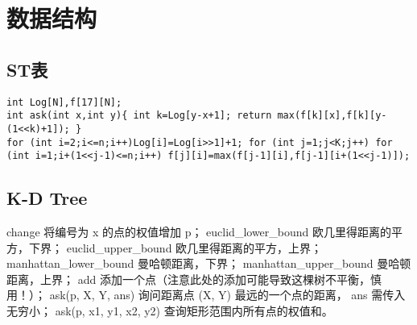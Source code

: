 \documentclass[landscape,a4paper]{article}
\begin{document}
\section{数据结构}
\subsection{ST表}
\begin{lstlisting}
int Log[N],f[17][N];
int ask(int x,int y){ int k=Log[y-x+1]; return max(f[k][x],f[k][y-(1<<k)+1]); }
for (int i=2;i<=n;i++)Log[i]=Log[i>>1]+1; for (int j=1;j<K;j++) for (int i=1;i+(1<<j-1)<=n;i++) f[j][i]=max(f[j-1][i],f[j-1][i+(1<<j-1)]);
\end{lstlisting}

\subsection{K-D Tree}

 change 将编号为 x 的点的权值增加 p；
 euclid\_lower\_bound 欧几里得距离的平方，下界；
 euclid\_upper\_bound 欧几里得距离的平方，上界；
 manhattan\_lower\_bound 曼哈顿距离，下界；
 manhattan\_upper\_bound 曼哈顿距离，上界；
 add 添加一个点（注意此处的添加可能导致这棵树不平衡，慎用！）；
 ask(p, X, Y, ans) 询问距离点 (X, Y) 最远的一个点的距离， ans 需传入无穷小；
 ask(p, x1, y1, x2, y2) 查询矩形范围内所有点的权值和。
\end{document}
